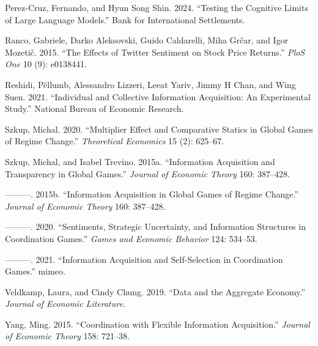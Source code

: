 \documentclass[
]{article}
\newlength{\cslhangindent}
\newenvironment{CSLReferences}[2] %
 {\begin{list}{}{%
  \setlength{\itemindent}{0pt}
  \setlength{\leftmargin}{0pt}
  \setlength{\parsep}{0pt}
  \ifodd #1
   \setlength{\leftmargin}{\cslhangindent}
   \setlength{\itemindent}{-1\cslhangindent}
  \fi
  \setlength{\itemsep}{#2\baselineskip}}}
 {\end{list}}
\theoremstyle{plain}
\theoremstyle{remark}
\begin{document}
\begin{CSLReferences}{1}{0}
Perez-Cruz, Fernando, and Hyun Song Shin. 2024. {``Testing the Cognitive
Limits of Large Language Models.''} Bank for International Settlements.

Ranco, Gabriele, Darko Aleksovski, Guido Caldarelli, Miha Grčar, and
Igor Mozetič. 2015. {``The Effects of Twitter Sentiment on Stock Price
Returns.''} \emph{PloS One} 10 (9): e0138441.

Reshidi, Pëllumb, Alessandro Lizzeri, Leeat Yariv, Jimmy H Chan, and
Wing Suen. 2021. {``Individual and Collective Information Acquisition:
An Experimental Study.''} National Bureau of Economic Research.

Szkup, Michal. 2020. {``Multiplier Effect and Comparative Statics in
Global Games of Regime Change.''} \emph{Theoretical Economics} 15 (2):
625--67.

Szkup, Michal, and Isabel Trevino. 2015a. {``Information Acquisition and
Transparency in Global Games.''} \emph{Journal of Economic Theory} 160:
387--428.

---------. 2015b. {``Information Acquisition in Global Games of Regime
Change.''} \emph{Journal of Economic Theory} 160: 387--428.

---------. 2020. {``Sentiments, Strategic Uncertainty, and Information
Structures in Coordination Games.''} \emph{Games and Economic Behavior}
124: 534--53.

---------. 2021. {``Information Acquisition and Self-Selection in
Coordination Games.''} mimeo.

Veldkamp, Laura, and Cindy Chung. 2019. {``Data and the Aggregate
Economy.''} \emph{Journal of Economic Literature}.

Yang, Ming. 2015. {``Coordination with Flexible Information
Acquisition.''} \emph{Journal of Economic Theory} 158: 721--38.

\end{CSLReferences}
\end{document}
